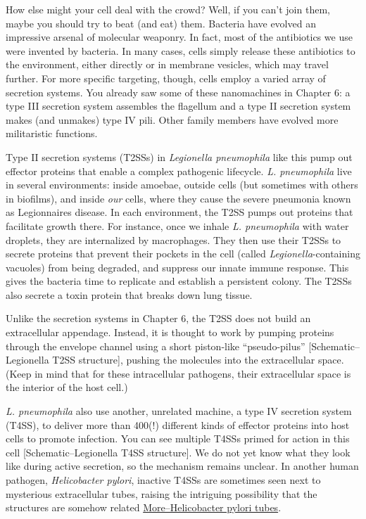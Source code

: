 \documentclass[]{tufte-book}
\begin{document}
How else might your cell deal with the crowd? Well, if you can't join
them, maybe you should try to beat (and eat) them. Bacteria have evolved
an impressive arsenal of molecular weaponry. In fact, most of the
antibiotics we use were invented by bacteria. In many cases, cells
simply release these antibiotics to the environment, either directly or
in membrane vesicles, which may travel further. For more specific
targeting, though, cells employ a varied array of secretion systems. You
already saw some of these nanomachines in Chapter 6: a type III
secretion system assembles the flagellum and a type II secretion system
makes (and unmakes) type IV pili. Other family members have evolved more
militaristic functions.

Type II secretion systems (T2SSs) in \emph{Legionella pneumophila} like
this pump out effector proteins that enable a complex pathogenic
lifecycle. \emph{L. pneumophila} live in several environments: inside
amoebae, outside cells (but sometimes with others in biofilms), and
inside \emph{our} cells, where they cause the severe pneumonia known as
Legionnaires disease. In each environment, the T2SS pumps out proteins
that facilitate growth there. For instance, once we inhale \emph{L.
pneumophila} with water droplets, they are internalized by macrophages.
They then use their T2SSs to secrete proteins that prevent their pockets
in the cell (called \emph{Legionella}-containing vacuoles) from being
degraded, and suppress our innate immune response. This gives the
bacteria time to replicate and establish a persistent colony. The T2SSs
also secrete a toxin protein that breaks down lung tissue.

Unlike the secretion systems in Chapter 6, the T2SS does not build an
extracellular appendage. Instead, it is thought to work by pumping
proteins through the envelope channel using a short piston-like
``pseudo-pilus'' {[}Schematic--Legionella T2SS structure{]}, pushing the
molecules into the extracellular space. (Keep in mind that for these
intracellular pathogens, their extracellular space is the interior of
the host cell.)

\emph{L. pneumophila} also use another, unrelated machine, a type IV
secretion system (T4SS), to deliver more than 400(!) different kinds of
effector proteins into host cells to promote infection. You can see
multiple T4SSs primed for action in this cell {[}Schematic--Legionella
T4SS structure{]}. We do not yet know what they look like during active
secretion, so the mechanism remains unclear. In another human pathogen,
\emph{Helicobacter pylori}, inactive T4SSs are sometimes seen next to
mysterious extracellular tubes, raising the intriguing possibility that
the structures are somehow related
\protect\hyperlink{morehelicobacter-pylori-tubes}{More--Helicobacter
pylori tubes}.
\end{document}
